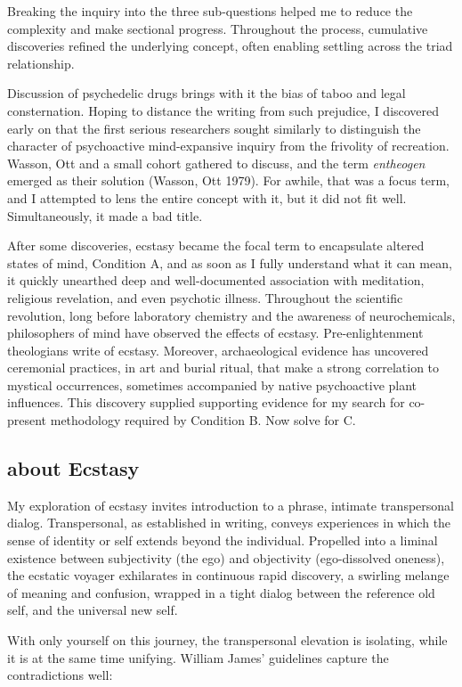 \documentclass{UIdahoMastersThesis}
\begin{document}
Breaking the inquiry into the three sub-questions helped me to reduce the complexity and make sectional progress. Throughout the process, cumulative discoveries refined the underlying concept, often enabling settling across the triad relationship.

Discussion of psychedelic drugs brings with it the bias of taboo and legal consternation. Hoping to distance the writing from such prejudice, I discovered early on that the first serious researchers sought similarly to distinguish the character of psychoactive mind-expansive inquiry from the frivolity of recreation. Wasson, Ott and a small cohort gathered to discuss, and the term \emph{entheogen} emerged as their solution (Wasson, Ott 1979). For awhile, that was a focus term, and I attempted to lens the entire concept with it, but it did not fit well. Simultaneously, it made a bad title. 

After some discoveries, ecstasy became the focal term to encapsulate altered states of mind, Condition A, and as soon as I fully understand what it can mean, it quickly unearthed deep and well-documented association with meditation, religious revelation, and even psychotic illness. Throughout the scientific revolution, long before laboratory chemistry and the awareness of neurochemicals, philosophers of mind have observed the effects of ecstasy. Pre-enlightenment theologians write of ecstasy. Moreover, archaeological evidence has uncovered ceremonial practices, in art and burial ritual, that make a strong correlation to mystical occurrences, sometimes accompanied by native psychoactive plant influences. This discovery supplied supporting evidence for my search for co-present methodology required by Condition B. Now solve for C.

\subsection{about Ecstasy}
My exploration of ecstasy invites introduction to a phrase, intimate transpersonal dialog. Transpersonal, as established in writing, conveys experiences in which the sense of identity or self extends beyond the individual. Propelled into a liminal existence between subjectivity (the ego) and objectivity (ego-dissolved oneness), the ecstatic voyager exhilarates in continuous rapid discovery, a swirling melange of meaning and confusion, wrapped in a tight dialog between the reference old self, and the universal new self. 

With only yourself on this journey, the transpersonal elevation is isolating, while it is at the same time unifying. William James' guidelines capture the contradictions well:
\end{document}
